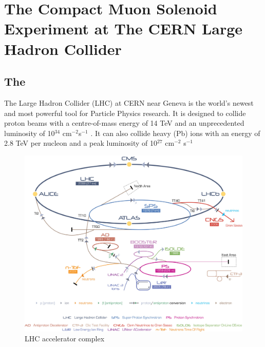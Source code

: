 
\chapter{The Compact Muon Solenoid Experiment at The CERN Large Hadron Collider}
\label{chap:CmsExp}

\section{The \LHC}

The Large Hadron Collider (LHC) at CERN near Geneva is the world's newest and
most powerful tool for Particle Physics research. It is designed to collide proton beams with a
centre-of-mass energy of 14 TeV and an unprecedented luminosity of 10$^{34}$ cm$^{-2}$s$^{-1}$
. It can also collide heavy (Pb) ions with an energy of 2.8 TeV per nucleon and a peak luminosity of 10$^{27}$ cm$^{-2}$
s$^{-1}$


\begin{figure}
  \includegraphics[width=\hugefigwidth]{chap_CMSDetector_figures/Cern-Accelerator-Complex}
  \caption[CERN accelerator complex]%
  {LHC  accelerator complex}
  \label{fig:CERNAccComplex}
\end{figure}




